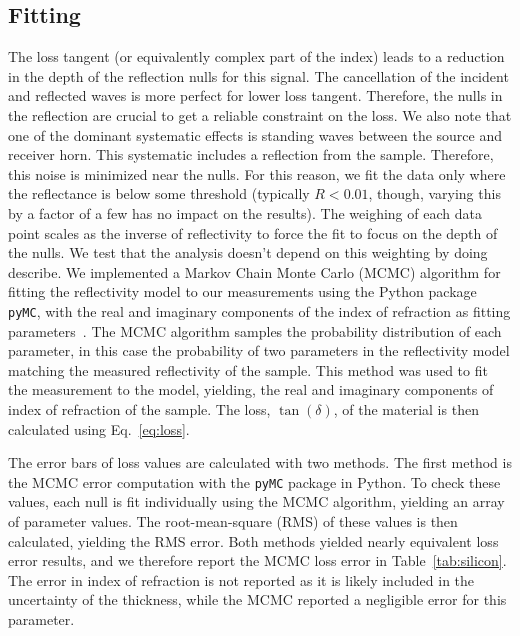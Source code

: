 \subsection{Fitting}
The loss tangent (or equivalently complex part of the index) leads to a reduction in the depth of the reflection nulls for this signal. The cancellation of the incident and reflected waves is more perfect for lower loss tangent. Therefore, the nulls in the reflection are crucial to get a reliable constraint on the loss. We also note that one of the dominant systematic effects is standing waves between the source and receiver horn. This systematic includes a reflection from the sample. Therefore, this noise is minimized near the nulls. For this reason, we fit the data only where the reflectance is below some threshold (typically $R<0.01$, though, varying this by a factor of a few has no impact on the results). The weighing of each data point scales as the inverse of reflectivity to force the fit to focus on the depth of the nulls. We test that the analysis doesn’t depend on this weighting by doing describe. We implemented a Markov Chain Monte Carlo (MCMC) algorithm for fitting the reflectivity model to our measurements using the Python package \verb|pyMC|, with the real and imaginary components of the index of refraction as fitting parameters~\cite{Patil2010PyMCBS}. The MCMC algorithm samples the probability distribution of each parameter, in this case the probability of two parameters in the reflectivity model matching the measured reflectivity of the sample. This method was used to fit the measurement to the model, yielding, the real and imaginary components of index of refraction of the sample. The loss, $\tan(\delta)$, of the material is then calculated using Eq.~\ref{eq:loss}.

The error bars of loss values are calculated with two methods. The first method is the MCMC error computation with the \verb|pyMC| package in Python. To check these values, each null is fit individually using the MCMC algorithm, yielding an array of parameter values. The root-mean-square (RMS) of these values is then calculated, yielding the RMS error. Both methods yielded nearly equivalent loss error results, and we therefore report the MCMC loss error in Table~\ref{tab:silicon}. The error in index of refraction is not reported as it is likely included in the uncertainty of the thickness, while the MCMC reported a negligible error for this parameter.

